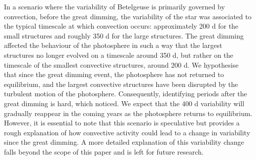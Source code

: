 \documentclass{aa}
\begin{document}
In a scenario where the variability of Betelgeuse is primarily governed by convection, before the great dimming, the variability of the star was associated to the typical timescale at which convection occurs: approximately 200 d for the small structures and roughly 350 d for the large structures. The great dimming affected the behaviour of the photosphere in such a way that the largest structures no longer evolved on a timescale around 350 d, but rather on the timescale of the smallest convective structures, around 200 d. We hypothesise that since the great dimming event, the photosphere has not returned to equilibrium, and the largest convective structures have been disrupted by the turbulent motion of the photosphere. Consequently, identifying periods after the great dimming is hard, which \cite{dupree_great_2022} noticed. We expect that the 400 d variability will gradually reappear in the coming years as the photosphere returns to equilibrium. However, it is essential to note that this scenario is speculative but provides a rough explanation of how convective activity could lead to a change in variability since the great dimming. A more detailed explanation of this variability change falls beyond the scope of this paper and is left for future research.


\end{document}
